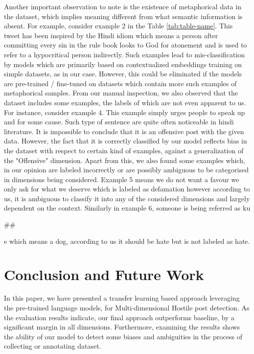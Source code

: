 \documentclass[runningheads]{llncs}
\begin{document}
Another important observation to note is the existence of metaphorical data in the dataset, which implies meaning different from what semantic information is absent. For example, consider example 2 in the Table \ref{tab:table-name}. This tweet has been inspired by the Hindi idiom which means a person after committing every sin in the rule book looks to God for atonement and is used to refer to a hypocritical person indirectly. Such examples lead to mis-classification by models which are primarily based on contextualized embeddings training on simple datasets, as in our case. However, this could be eliminated if the models are pre-trained / fine-tuned on datasets which contain more such examples of metaphorical samples. From our manual inspection, we also observed that the dataset includes some examples, the labels of which are not even apparent to us. For instance, consider example 4. This example simply urges people to speak up and for some cause. Such type of sentence are quite often noticeable in hindi literature. It is impossible to conclude that it is an offensive post with the given data. However, the fact that it is correctly classified by our model reflects bias in the dataset with respect to certain kind of examples, against a generalization of the "Offensive" dimension. Apart from this, we also found some examples which, in our opinion are labeled incorrectly or are possibly ambiguous to be categorised in dimensions being considered. Example 5 means we do not want a favour we only ask for what we deserve which is labeled as defamation however according to us, it is ambiguous to classify it into any of the considered dimensions and largely dependent on the context. Similarly in example 6, someone is being referred as ku\begin{small}\#\#\end{small}e which means a dog, according to us it should be hate but is not labeled as hate.

\section{Conclusion and Future Work}

In this paper, we have presented a transfer learning based approach leveraging the pre-trained language models, for Multi-dimensional Hostile post detection. As the evaluation results indicate, our final approach outperforms baseline, by a significant margin in all dimensions. Furthermore, examining the results shows the ability of our model to detect some biases and ambiguities in the process of collecting or annotating dataset. \\
\end{document}
